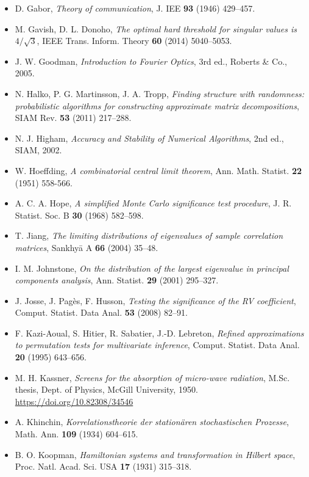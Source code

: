 \documentclass[10pt,letterpaper,twocolumn]{article}
\begin{document}
\begin{itemize}
\item
  D. Gabor, \emph{Theory of communication}, J. IEE \textbf{93} (1946) 429--457.
\item
  M. Gavish, D. L. Donoho, \emph{The optimal hard threshold for singular values is \(4/\sqrt{3}\)}, IEEE Trans. Inform. Theory \textbf{60} (2014) 5040--5053.
\item
  J. W. Goodman, \emph{Introduction to Fourier Optics}, 3rd ed., Roberts \& Co., 2005.
\item
  N. Halko, P. G. Martinsson, J. A. Tropp, \emph{Finding structure with randomness: probabilistic algorithms for constructing approximate matrix decompositions}, SIAM Rev. \textbf{53} (2011) 217--288.
\item
  N. J. Higham, \emph{Accuracy and Stability of Numerical Algorithms}, 2nd ed., SIAM, 2002.
\item
  W. Hoeffding, \emph{A combinatorial central limit theorem}, Ann. Math. Statist. \textbf{22} (1951) 558-566.
\item
  A. C. A. Hope, \emph{A simplified Monte Carlo significance test procedure}, J. R. Statist. Soc. B \textbf{30} (1968) 582--598.
\item
  T. Jiang, \emph{The limiting distributions of eigenvalues of sample correlation matrices}, Sankhyā A \textbf{66} (2004) 35--48.
\item
  I. M. Johnstone, \emph{On the distribution of the largest eigenvalue in principal components analysis}, Ann. Statist. \textbf{29} (2001) 295--327.
\item
  J. Josse, J. Pagès, F. Husson, \emph{Testing the significance of the RV coefficient}, Comput. Statist. Data Anal. \textbf{53} (2008) 82--91.
\item
  F. Kazi-Aoual, S. Hitier, R. Sabatier, J.-D. Lebreton, \emph{Refined approximations to permutation tests for multivariate inference}, Comput. Statist. Data Anal. \textbf{20} (1995) 643--656.
\item
  M. H. Kassner, \emph{Screens for the absorption of micro-wave radiation}, M.Sc. thesis, Dept. of Physics, McGill University, 1950. \href{https://doi.org/10.82308/34546}{https:\allowbreak{}/\allowbreak{}/\allowbreak{}doi.\allowbreak{}org/\allowbreak{}10.\allowbreak{}82308/\allowbreak{}34546}
\item
  A. Khinchin, \emph{Korrelationstheorie der stationären stochastischen Prozesse}, Math. Ann. \textbf{109} (1934) 604--615.
\item
  B. O. Koopman, \emph{Hamiltonian systems and transformation in Hilbert space}, Proc. Natl. Acad. Sci. USA \textbf{17} (1931) 315--318.

\end{itemize}
\end{document}
